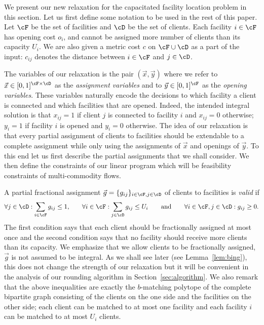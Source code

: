 We present our new relaxation for the capacitated facility location problem in this section. Let us first define some notation to be used in the rest of this paper. Let $\cF$ be the set of facilities and $\cD$ be the set of clients. Each facility $i\in\cF$ has opening cost $o_i$, and cannot be assigned more number of clients than its capacity $U_i$. We are also given a metric cost $c$ on $\cF\cup\cD$ as a part of the input: $c_{ij}$ denotes the distance between $i\in\cF$ and $j\in\cD$.

The variables of our relaxation is the pair $(\vec{x}, \vec{y})$ where we refer to $\vec{x}\in
[0,1]^{\cF \times \cD}$ as the \emph{assignment variables} and to $\vec{y}\in [0,1]^{\cF}$ as the \emph{opening variables}. These variables naturally encode the decisions to which facility a client is connected
and which facilities that are opened. Indeed, the intended integral solution is that $x_{ij} =1$ if
client $j$ is connected to facility $i$ and $x_{ij} = 0$ otherwise; $y_i=1$ if facility $i$ is
opened and $y_i = 0$ otherwise. The idea of our relaxation is that every partial assignment of
clients to facilities should be extendable to a complete assignment while only using the assignments
of $\vec{x}$ and openings of $\vec{y}$. To this end let us first describe the partial assignments
that we shall consider. We then define the constraints of our linear program which will be
feasibility constraints of multi-commodity flows.

A partial fractional assignment $\vec{g}=\{g_{ij}\}_{i\in \cF, j \in \cD}$ of clients to facilities is  \emph{valid} if
$$
\forall j\in
\cD: \sum_{i\in \cF} g_{ij} \leq 1   \mbox{,} \qquad  \forall i \in \cF: \sum_{j\in \cD}
g_{ij} \leq U_i \qquad \mbox{and} \qquad  \forall i \in \cF, j\in \cD: g_{ij}\geq 0.
$$
The first condition says that each client should be fractionally assigned at most once and the
second condition says that no facility should receive more clients than its capacity. We emphasize
that we allow clients to be fractionally assigned, \ie $\vec{g}$ is not assumed to  be integral. As we
shall see later (see Lemma~\ref{lem:bing}), this does not change the strength of our relaxation but it will
be convenient in the analysis of our rounding algorithm in Section~\ref{sec:algorithm}. We also remark that
the above inequalities are exactly the $b$-matching polytope of the complete bipartite graph
consisting of the clients on the one side and the facilities on the other side; each client can be
matched to at most one facility and each facility $i$ can be matched to at most $U_i$ clients.

